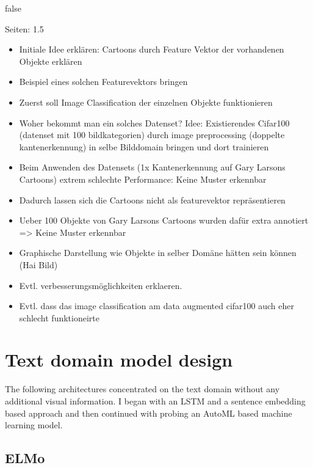 \documentclass[draft,final,oneside]{vutinfth} %
\begin{document}
\if false

Seiten: 1.5

\begin{itemize}
\item Initiale Idee erklären: Cartoons durch Feature Vektor der vorhandenen Objekte erklären
\item Beispiel eines solchen Featurevektors bringen
\item Zuerst soll Image Classification der einzelnen Objekte funktionieren
\item Woher bekommt man ein solches Datenset? Idee: Existierendes Cifar100 (datenset mit 100 bildkategorien) durch image preprocessing (doppelte kantenerkennung) in selbe Bilddomain bringen und dort trainieren
\item Beim Anwenden des Datensets (1x Kantenerkennung auf Gary Larsons Cartoons) extrem schlechte Performance: Keine Muster erkennbar
\item Dadurch lassen sich die Cartoons nicht als featurevektor repräsentieren
\item Ueber 100 Objekte von Gary Larsons Cartoons wurden dafür extra annotiert => Keine Muster erkennbar
\item Graphische Darstellung wie Objekte in selber Domäne hätten sein können (Hai Bild)
\item Evtl. verbesserungsmöglichkeiten erklaeren.
\item Evtl. dass das image classification am data augmented cifar100 auch eher schlecht funktioneirte
\end{itemize}

\fi

\section{Text domain model design}

The following architectures concentrated on the text domain without any additional visual information. I began with an LSTM and a sentence embedding based approach and then continued with probing an AutoML based machine learning model.

\subsection{ELMo}
\end{document}
